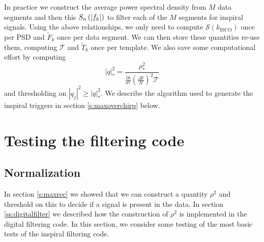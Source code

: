 In practice we construct the average power spectral density from $M$ data
segments and then this $S_n\left(\left|f_{k}\right|\right)$ to filter each of the $M$ segments for
inspiral signals. Using the above relationships, we only need to compute
$\mathcal{S}(k_\mathrm{ISCO})$ once per PSD and $\tilde{F}_k$ once per data
segment. We can then store these quantities re-use them, computing
$\mathcal{T}$ and $\tilde{T}_k$ once per template. We also save some
computational effort by computing
\begin{equation}
|q|^2_\ast = \frac{\rho^2_\ast} 
{\frac{16}{\sigma^2}\left(\frac{\Delta t}{N}\right)^2 \mathcal{T}}
\end{equation}
and thresholding on $|q_j|^2 \ge |q|^2_\ast$. We describe the algorithm used to
generate the inspiral triggers in section \ref{s:maxoverchirp} below.

\section{Testing the filtering code}
\label{s:testing}

\subsection{Normalization}
\label{ss:normalization}

In section \ref{s:maxrec} we showed that we can construct a quantity $\rho^2$
and threshold on this to decide if a signal is present in the data. In section
\ref{ss:digitalfilter} we described how the construction of $\rho^2$ is
implemented in the digital filtering code. In this section, we consider some 
testing of the most basic tests of the inspiral filtering code.

